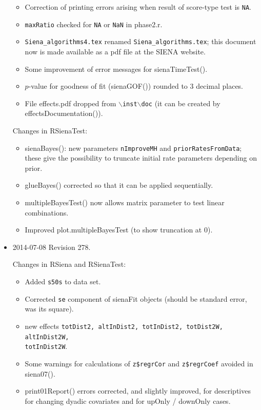 \documentclass[a4paper,fleqn,11pt]{article}
\newcommand{\+}{\, + \,}
\newcommand{\sfn}[1]{\textsf{#1}}
\newcommand{\SI}{{\sf SIENA }}
\begin{document}
\begin{small}
\begin{itemize}
\begin{itemize}
   \item Correction of printing errors arising when result of score-type test is \texttt{NA}.
   \item \texttt{maxRatio} checked for \texttt{NA} or \texttt{NaN} in \sfn{phase2.r}.
   \item \texttt{Siena\_algorithms4.tex} renamed \texttt{Siena\_algorithms.tex};
         this document now is made available as a pdf file at the \SI website.
   \item Some improvement of error messages for \sfn{sienaTimeTest()}.
   \item $p$-value for goodness of fit (\sfn{sienaGOF()}) rounded to 3 decimal places.
   \item File \sfn{effects.pdf} dropped from \texttt{{$\backslash$}inst{$\backslash$}doc}
          (it can be created by \sfn{effectsDocumentation()}).
\end{itemize}
Changes in RSienaTest:
\begin{itemize}
   \item \sfn{sienaBayes()}: new parameters \texttt{nImproveMH} and \texttt{priorRatesFromData};
      these give the possibility to truncate initial rate parameters depending on prior.
   \item \sfn{glueBayes()} corrected so that it can be applied sequentially.
   \item \sfn{multipleBayesTest()} now allows matrix parameter to test
     linear combinations.
   \item Improved \sfn{plot.multipleBayesTest} (to show truncation at 0).
\end{itemize}

\item 2014-07-08  Revision 278.

Changes in RSiena and RSienaTest:
\begin{itemize}
   \item Added \texttt{s50s} to data set.
   \item Corrected \texttt{se} component of \sfn{sienaFit} objects
     (should be standard error, was its square).
   \item new effects \texttt{totDist2, altInDist2, totInDist2,
     totDist2W, altInDist2W,\\
      totInDist2W}.
   \item Some warnings for calculations of \texttt{z\$regrCor}
   and \texttt{z\$regrCoef} avoided in \sfn{siena07()}.
   \item \sfn{print01Report()} errors corrected, and slightly improved,
    for descriptives for changing dyadic covariates
    and for upOnly / downOnly cases.
\end{itemize}


\end{itemize}
\end{small}
\end{document}
